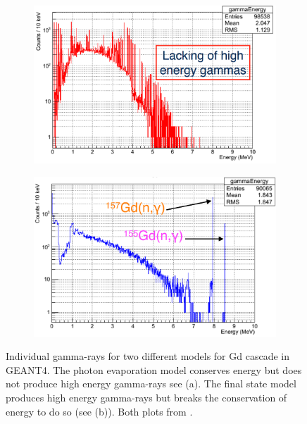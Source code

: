 \begin{figure}[!h]
\centering
\begin{subfigure}{.5\textwidth}
  \centering
  \includegraphics[width=\linewidth]{Chapter4/Figs/Raster/gadolinium/photonEvaporationGd.png}
  \captionsetup{width=.9\linewidth}
  \caption{}
  \label{subFig:differentGEANT4Models_photonEvaporationGd}
\end{subfigure}%
\begin{subfigure}{.5\textwidth}
  \centering
  \includegraphics[width=\linewidth]{Chapter4/Figs/Raster/gadolinium/FinalStateGd.png}
  \captionsetup{width=.9\linewidth}
  \caption{}
  \label{subFig:differentGEANT4Models_finalStateGd}
\end{subfigure}
\caption[Individual gamma-rays from 2 different models Gd cascade models in GEANT4.]{Individual gamma-rays for two different models for Gd cascade in GEANT4. The photon evaporation model conserves energy but does not produce high energy gamma-rays see (a). The final state model produces high energy gamma-rays but breaks the conservation of energy to do so (see (b)). Both plots from \cite{YuChen_2015}.}
\label{fig:differentGEANT4Models}
\end{figure}

